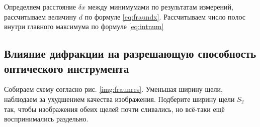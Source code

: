 \documentclass[a5paper,10pt, twoside]{article} %
\begin{document}
Определяем расстояние $\delta x$ между минимумами по результатам измерений, рассчитываем величину 
$d$ по формуле \eqref{eq:fraundx}. Рассчитываем число полос внутри главного максимума по формуле 
\eqref{eq:intnum}

\subsection{Влияние дифракции на разрешающую способность оптического инструмента}

Собираем схему согласно рис. \ref{img:fraunres}. Уменьшая ширину щели, наблюдаем за ухудшением 
качества изображения. Подберите ширину щели $S_2$ так, чтобы изображения обеих щелей почти сливались, 
но всё-таки ещё воспринимались раздельно.
\end{document}
